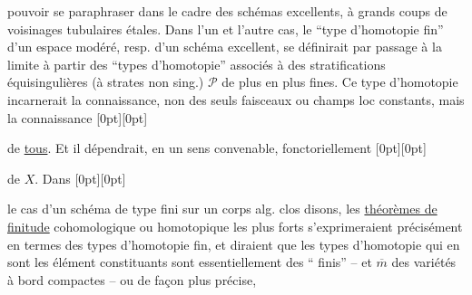 %
pouvoir se paraphraser dans le cadre des schémas excellents, à grands coups de voisinages tubulaires étales. Dans l'un et l'autre cas, le ``type d'homotopie fin'' d'un espace modéré, resp. d'un schéma excellent, se définirait par passage à la limite à partir des ``types d'homotopie'' associés à des stratifications équisingulières (à strates non sing.) $\mathcal P$ de plus en plus fines. Ce type d'homotopie  incarnerait la connaissance, non des seuls faisceaux ou champs loc constants, mais  la connaissance%
\raisebox{-1.2ex}[0pt][0pt]{\parbox{0pt}{}} de \uline{tous}. Et il dépendrait, en un sens convenable, fonctoriellement%
\raisebox{-0.5ex}[0pt][0pt]{\parbox{0pt}{}} de $X$. Dans%
\raisebox{-1.0ex}[0pt][0pt]{\parbox{0pt}{}} le cas d'un schéma de type fini sur un corps alg. clos disons, les \uline{théorèmes de finitude} cohomologique ou homotopique les plus forts s'exprimeraient précisément en termes des types d'homotopie fin, et diraient que les types d'homotopie  qui en sont les élément constituants sont essentiellement des `` finis'' -- et $\overline m$ des variétés à bord compactes -- ou de façon plus précise,
